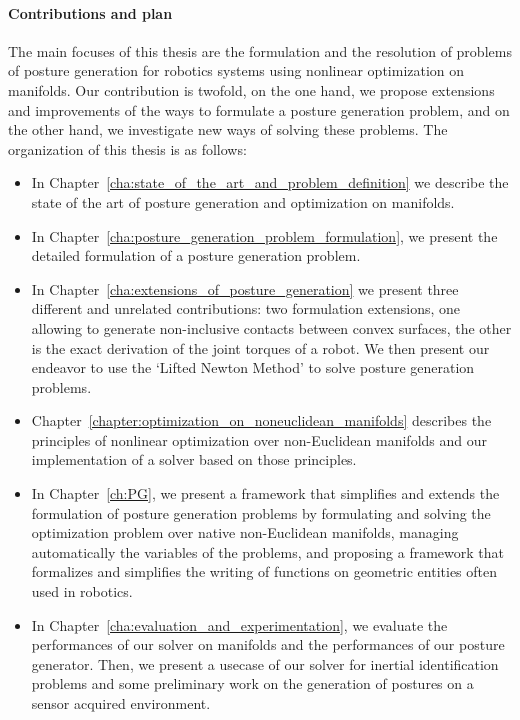 \paragraph{Contributions and plan}
The main focuses of this thesis are the formulation and the resolution of problems of posture generation for robotics systems using nonlinear optimization on manifolds.
Our contribution is twofold, on the one hand, we propose extensions and improvements of the ways to formulate a posture generation problem, and on the other hand, we investigate new ways of solving these problems.
The organization of this thesis is as follows:
\begin{itemize}
  \item In Chapter~\ref{cha:state_of_the_art_and_problem_definition} we describe the state of the art of posture generation and optimization on manifolds.
  \item In Chapter~\ref{cha:posture_generation_problem_formulation}, we present the detailed formulation of a posture generation problem.
  \item In Chapter~\ref{cha:extensions_of_posture_generation} we present three different and unrelated contributions: two formulation extensions, one allowing to generate non-inclusive contacts between convex surfaces, the other is the exact derivation of the joint torques of a robot.
  We then present our endeavor to use the `Lifted Newton Method' to solve posture generation problems.
  \item Chapter~\ref{chapter:optimization_on_noneuclidean_manifolds} describes the principles of nonlinear optimization over non-Euclidean manifolds and our implementation of a solver based on those principles.
  \item In Chapter~\ref{ch:PG}, we present a framework that simplifies and extends the formulation of posture generation problems by formulating and solving the optimization problem over native non-Euclidean manifolds, managing automatically the variables of the problems, and proposing a framework that formalizes and simplifies the writing of functions on geometric entities often used in robotics.
  \item In Chapter~\ref{cha:evaluation_and_experimentation}, we evaluate the performances of our solver on manifolds and the performances of our posture generator. Then, we present a usecase of our solver for inertial identification problems and some preliminary work on the generation of postures on a sensor acquired environment.
\end{itemize}


